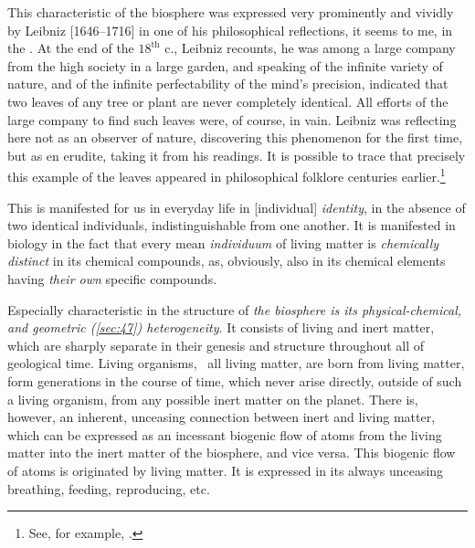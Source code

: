 This characteristic of the biosphere was expressed very prominently and vividly
by Leibniz [1646--1716] in one of his philosophical reflections, it seems to
me, in the .  At the end of the $18^\mathrm{th}$ c., Leibniz recounts, he was among a
large company from the high society in a large garden, and speaking of the
infinite variety of nature, and of the infinite perfectability of the mind's
precision, indicated that two leaves of
any tree or plant are never completely identical.  All efforts of the large
company to find such leaves were, of course, in vain.  Leibniz was reflecting
here not as an observer of nature, discovering this phenomenon for the first
time, but as en erudite, taking it from his readings.  It is possible to trace
that precisely this example of the leaves appeared in philosophical folklore
centuries earlier.\footnote{
	See, for example, \cite[кн.~2,
	с.~54]{carus1913prirode}\nocite{carus1936prirode, carus1851nature}.}

This is manifested for us in everyday life in [individual]
\emph{identity}, in the absence of two identical
individuals, indistinguishable from one another.  It is manifested in biology
in the fact that every mean \emph{individuum} of living
matter is \emph{chemically distinct} in its chemical compounds, as, obviously,
also in its chemical elements having \emph{their own} specific compounds.


\Section %
Especially characteristic in the structure of \emph{the biosphere is its
physical-chemical, and geometric \emph{(\autoref{sec:47})} heterogeneity}.  It
consists of living and inert matter, which are sharply separate in their
genesis and structure throughout all of geological time.  Living organisms,
\ie\ all living matter, are born from living matter,  form
generations in the course of time, which never arise directly, outside of such
a living organism, from any possible inert matter on the planet.  There is,
however, an inherent, unceasing connection between inert and living matter, which can be expressed
as an incessant biogenic flow of atoms from the living matter into the inert
matter of the biosphere, and vice versa.  This biogenic flow of atoms is
originated by living matter.  It is expressed in its always unceasing
breathing, feeding, reproducing, etc.

